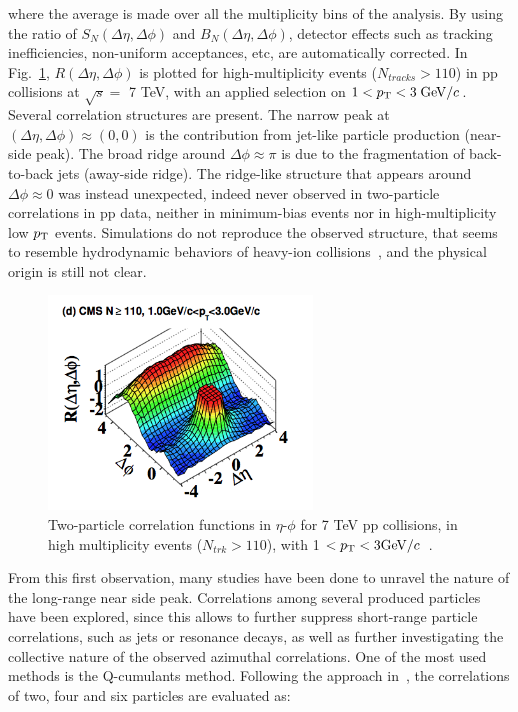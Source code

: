 where the average is made over all the multiplicity bins of the analysis. By using the ratio of $S_N(\Delta \eta,\Delta \phi)$ and $B_N(\Delta \eta,\Delta \phi)$, detector effects such as tracking inefficiencies, non-uniform acceptances, etc, are automatically corrected. In Fig.~\ref{fig:CMSLongRangeRidge_pp7TeV}, $R(\Delta \eta,\Delta \phi)$ is plotted for high-multiplicity events ($N_{tracks} > 110$) in pp collisions at $\sqrt{s} = $ 7 TeV, with an applied selection on $1 <p_{\rm T} < 3\; \mathrm{GeV}/c$. Several correlation structures are present. The narrow peak at $(\Delta \eta, \Delta \phi) \approx (0,0)$ is the contribution from jet-like particle production (near-side peak). The broad ridge around $\Delta \phi \approx \pi$ is due to the fragmentation of back-to-back jets (away-side ridge). The ridge-like structure that appears around $\Delta \phi \approx 0$ was instead unexpected, indeed never observed in two-particle correlations in pp data, neither in minimum-bias events nor in high-multiplicity low $p_{\rm T}$ events. Simulations do not reproduce the observed structure, that seems to resemble hydrodynamic behaviors of heavy-ion collisions~\cite{Alver:2008aa,Alver:2009id,Abelev:2009jv}, and the physical origin is still not clear.
\begin{figure}[!ht]
  \centering
  \includegraphics[width=7cm]{FigCap1/CMSLongRangeRidge_pp7TeV.png}
  \caption{Two-particle correlation functions in $\eta$-$\phi$ for 7 TeV pp collisions, in high multiplicity events ($N_{trk}>110$), with 1 $< p_{\rm T} < 3 \mathrm{GeV}/c$~\cite{Khachatryan:2010gv}.}
  \label{fig:CMSLongRangeRidge_pp7TeV}
\end{figure}
From this first observation, many studies have been done to unravel the nature of the long-range near side peak. Correlations among several produced particles have been explored, since this allows to further suppress short-range particle correlations, such as jets or resonance decays, as well as further investigating the collective nature of the observed azimuthal correlations. One of the most used methods is the Q-cumulants method. Following the approach in~\cite{Bilandzic:2010jr}, the correlations of two, four and six particles are evaluated as:
